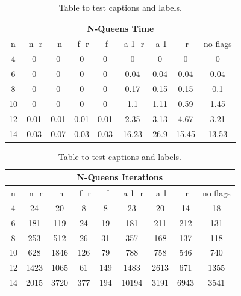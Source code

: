 \begin{table}[h!]
	\centering
	\begin{tabular}{| c | c | c | c | c | c | c | c | c |}
		\hline
		\multicolumn{9}{|c|}{N-Queens Time}                                  \\ \hline
		n  & -n -r & -n   & -f -r & -f   & -a 1 -r & -a 1 & -r    & no flags \\ \hline
		4  & 0     & 0    & 0     & 0    & 0       & 0    & 0     & 0        \\ \hline
		6  & 0     & 0    & 0     & 0    & 0.04    & 0.04 & 0.04  & 0.04     \\ \hline
		8  & 0     & 0    & 0     & 0    & 0.17    & 0.15 & 0.15  & 0.1      \\ \hline
		10 & 0     & 0    & 0     & 0    & 1.1     & 1.11 & 0.59  & 1.45     \\ \hline
		12 & 0.01  & 0.01 & 0.01  & 0.01 & 2.35    & 3.13 & 4.67  & 3.21     \\ \hline
		14 & 0.03  & 0.07 & 0.03  & 0.03 & 16.23   & 26.9 & 15.45 & 13.53    \\ \hline
	\end{tabular}
	\caption{Table to test captions and labels.}
	\label{tab:queens:time}
\end{table}




\begin{table}[h!]
	\centering
	\begin{tabular}{| c | c | c | c | c | c | c | c | c |}
		\hline
		\multicolumn{9}{|c|}{N-Queens Iterations}                          \\ \hline
		n  & -n -r & -n   & -f -r & -f  & -a 1 -r & -a 1 & -r   & no flags \\ \hline
		4  & 24    & 20   & 8     & 8   & 23      & 20   & 14   & 18       \\ \hline
		6  & 181   & 119  & 24    & 19  & 181     & 211  & 212  & 131      \\ \hline
		8  & 253   & 512  & 26    & 31  & 357     & 168  & 137  & 118      \\ \hline
		10 & 628   & 1846 & 126   & 79  & 788     & 758  & 546  & 740      \\ \hline
		12 & 1423  & 1065 & 61    & 149 & 1483    & 2613 & 671  & 1355     \\ \hline
		14 & 2015  & 3720 & 377   & 194 & 10194   & 3191 & 6943 & 3541     \\ \hline
	\end{tabular}
	\caption{Table to test captions and labels.}
	\label{tab:queens:iterations}
\end{table}



